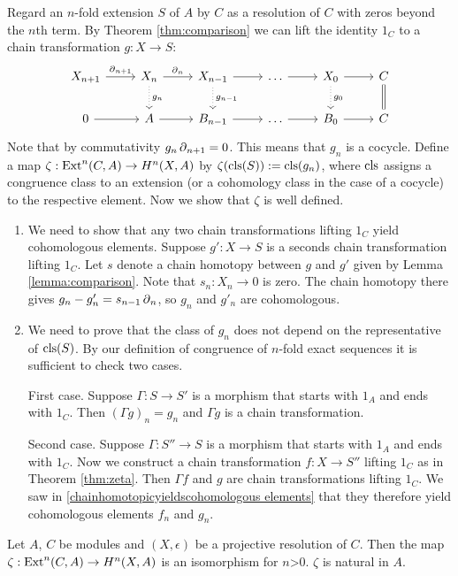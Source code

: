 Regard an $n$-fold extension $S$ of $A$ by $C$ as a resolution of $C$ with zeros beyond the $n$th term.
By Theorem \ref{thm:comparison} we can lift the identity $1_C$ to a chain transformation $g:X\to S$:
\[
\begin{tikzcd}
X_{n+1} \arrow{r}{\bdd{n+1}} & 
X_n \arrow{r}{\bdd{n}} \arrow[dotted]{d}{g_n} & 
X_{n-1}\arrow{r} \arrow[dotted]{d}{g_{n-1}}&
\dots \arrow{r} & 
X_0 \arrow{r} \arrow[dotted]{d}{g_{0}}& 
C \arrow[d,equal]
\\
0 \arrow{r} &
A \arrow{r} & 
B_{n-1} \arrow{r} &
\dots \arrow{r} &
B_0 \arrow{r} &
C
\end{tikzcd}
\]
Note that by commutativity $g_n \operatorname{\partial}_{n+1} = 0$.
This means that $g_n$ is a cocycle.
Define a map $\zeta: \operatorname{Ext}^{n}(C,A) \to H^{n}(X,A)$ by $\zeta( \operatorname{cls}(S)) := \operatorname{cls}(g_n)$, where $\operatorname{cls}$ assigns a congruence class to an extension (or a cohomology class in the case of a cocycle) to the respective element.
Now we show that $\zeta$ is well defined.
\begin{enumerate}
\item \label{chainhomotopicyieldscohomologous elements}
We need to show that any two chain transformations lifting $1_C$ yield cohomologous elements.
Suppose $g':X\to S$ is a seconds chain transformation lifting $1_C$.
Let $s$ denote a chain homotopy between $g$ and $g'$ given by Lemma \ref{lemma:comparison}.
Note that $s_n: X_n \to 0$ is zero.
The chain homotopy there gives $g_n-g'_n= s_{n-1} \operatorname{\partial}_{n}$, so $g_n$ and $g'_n$ are cohomologous.
\item
We need to prove that the class of $g_n$ does not depend on the representative of $\operatorname{cls}(S)$.
By our definition of congruence of $n$-fold exact sequences it is sufficient to check two cases.

First case.
Suppose $\Gamma: S\to S'$ is a morphism that starts with $1_A$  and ends with $1_C$.
Then $(\Gamma g)_n = g_n$ and $\Gamma g$ is a chain transformation.

Second case.
Suppose $\Gamma: S'' \to S$ is a morphism that starts with $1_A$ and ends with $1_C$. 
Now we construct a chain transformation $f: X \to S''$ lifting $1_C$ as in Theorem \ref{thm:zeta}.
Then $\Gamma f$ and $g$ are chain transformations lifting $1_C$.
We saw in \ref{chainhomotopicyieldscohomologous elements} that they therefore yield cohomologous elements $f_n$ and $g_n$.
\end{enumerate}
\begin{theorem}\cite[Theorem III.6.4.]{maclane}
\label{thm:zeta}
Let $A$, $C$ be modules and
$(X,\epsilon)$
be a projective resolution of $C$.
Then the map
$
\zeta: \operatorname{Ext}^{n}(C,A) \to H^{n}(X,A)
$
is an isomorphism for $n$>0.
$\zeta$ is natural in $A$.
\end{theorem}
